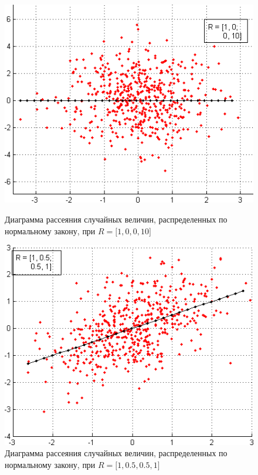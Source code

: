 \begin{figure}[h!]
  \begin{minipage}[h!]{0.47\linewidth}
    \includegraphics[width=1\linewidth]{pic/normal_our_2}
    \caption{Диаграмма рассеяния случайных величин, распределенных по нормальному закону,
      при $ R = \big[1, 0, 0, 10 \big] $
  }
  \end{minipage}
  \hfill
  \begin{minipage}[h!]{0.47\linewidth}
    \includegraphics[width=1\linewidth]{pic/normal_our_3}
    \caption{Диаграмма рассеяния случайных величин, распределенных по нормальному закону,
      при $ R = \big[1, 0.5, 0.5, 1 \big] $
  }
  \end{minipage}
\end{figure}

